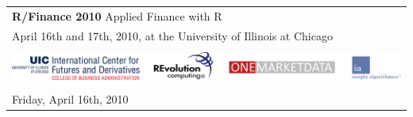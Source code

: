 \documentclass[11pt]{article}
\newcommand{\ra}[1]{\renewcommand{\arraystretch}{#1}}  %
\begin{document}
\thispagestyle{empty}


\ra{1.2} \sf

\begin{tabular}{rlrlp{5in}} %

  \multicolumn{5}{l}{\Huge \textbf{\color{KeynoteTalk} R/Finance 2010} \huge \phantom{i} Applied Finance with R} \\
  \multicolumn{5}{l}{\large \color{Breaks} April 16th and 17th, 2010, at the University of Illinois at Chicago} \\[3pt]

  \bottomrule \\

  \multicolumn{5}{l}{
    \centering
    \includegraphics[page=1,scale=0.15]{alllogos.pdf}
  } \\[5pt]

  \bottomrule \\[3pt]

  \multicolumn{5}{l}{\large Friday, April 16th, 2010} \\


\end{tabular}
\end{document}
